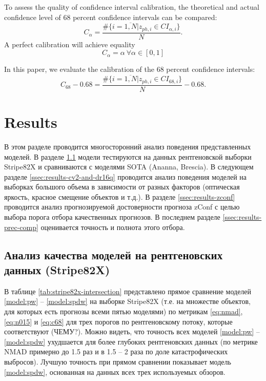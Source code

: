 \documentclass[fleqn,usenatbib]{mnras}
\begin{document}
To assess the quality of confidence interval calibration, the theoretical and actual confidence level of 68 percent confidence intervals can be compared:
\begin{equation}\label{eq:calpha}
    C_{\alpha} = \frac{\#\{i = \overline{1, N} | z_{ph,i} \in CI_{\alpha, i}\}}{N}.
\end{equation}
A perfect calibration will achieve equality
\begin{equation}\label{eq:perfect-ci}
    C_{\alpha} = \alpha ~ \forall \alpha \in [0, 1]
\end{equation}

In this paper, we evaluate the calibration of the 68 percent confidence intervals:
\begin{equation}\label{eq:c68}
    C_{68} - 0.68 = \frac{\#\{i = \overline{1, N} | z_{ph,i} \in CI_{68, i}\}}{N} - 0.68.
\end{equation}

\clearpage

\section{Results}

В этом разделе проводится многосторонний анализ поведения представленных моделей. В разделе \ref{ssec:results-s82x} модели тестируются на данных рентгеновской выборки Stripe82X и сравниваются с моделями SOTA (Ananna, Brescia). В следующем разделе \ref{ssec:results-cv2-and-dr16q} проводится анализ поведения моделей на выборках большого объема в зависимости от разных факторов (оптическая яркость, красное смещение объектов и т.д.). В разделе \ref{ssec:results-zconf} проводится анализ прогнозируемой достоверности прогноза zConf с целью выбора порога отбора качественных прогнозов. В последнем разделе \ref{ssec:results-prec-comp} оценивается точность и полнота этого отбора.

\subsection{Анализ качества моделей на рентгеновских данных (Stripe82X)}\label{ssec:results-s82x}

В таблице \ref{tab:stripe82x-intersection} представлено прямое сравнение моделей \ref{model:pw} -- \ref{model:spdw} на выборке Stripe82X (т.е. на множестве объектов, для которых есть прогнозы всеми пятью моделями) по метрикам \ref{eq:nmad}, \ref{eq:n015} и  \ref{eq:c68} для трех порогов по рентгеновскому потоку, которые соответствуют (ЧЕМУ?). Можно видеть, что точность всех моделей \ref{model:pw} -- \ref{model:spdw} ухудшается для более глубоких рентгеновских данных (по метрике NMAD примерно до 1.5 раз и в 1.5 -- 2 раза по доле катастрофических выбросов). Лучшую точность при прямом сравнении показывает модель \ref{model:spdw}, основанная на данных всех трех используемых обзоров.
\end{document}
